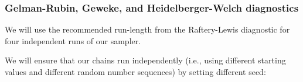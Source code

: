 \documentclass[
  11pt,
]{article}
\newenvironment{Shaded}{\begin{snugshade}}{\end{snugshade}}
\newcommand{\AttributeTok}[1]{\textcolor[rgb]{0.13,0.29,0.53}{#1}}
\newcommand{\CommentTok}[1]{\textcolor[rgb]{0.56,0.35,0.01}{\textit{#1}}}
\newcommand{\ConstantTok}[1]{\textcolor[rgb]{0.56,0.35,0.01}{#1}}
\newcommand{\ControlFlowTok}[1]{\textcolor[rgb]{0.13,0.29,0.53}{\textbf{#1}}}
\newcommand{\DecValTok}[1]{\textcolor[rgb]{0.00,0.00,0.81}{#1}}
\newcommand{\FunctionTok}[1]{\textcolor[rgb]{0.13,0.29,0.53}{\textbf{#1}}}
\newcommand{\NormalTok}[1]{#1}
\newcommand{\OtherTok}[1]{\textcolor[rgb]{0.56,0.35,0.01}{#1}}
\newcommand{\SpecialCharTok}[1]{\textcolor[rgb]{0.81,0.36,0.00}{\textbf{#1}}}
\begin{document}
\hypertarget{gelman-rubin-geweke-and-heidelberger-welch-diagnostics}{%
\subsubsection{Gelman-Rubin, Geweke, and Heidelberger-Welch diagnostics}\label{gelman-rubin-geweke-and-heidelberger-welch-diagnostics}}

We will use the recommended run-length from the Raftery-Lewis diagnostic
for four independent runs of our sampler.

We will ensure that our chains run independently (i.e., using different
starting values and different random number sequences) by setting
different seed:

\begin{Shaded}
\end{Shaded}
\end{document}
